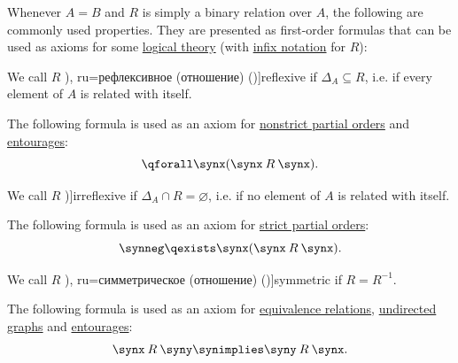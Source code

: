 \begin{comments}
\begin{definition}
  Whenever \( A = B \) and \( R \) is simply a binary relation over \( A \), the following are commonly used properties. They are presented as first-order formulas that can be used as axioms for some \hyperref[def:logical_theory]{logical theory} (with \hyperref[def:function_application_notation/infix]{infix notation} for \( R \)):
  \begin{thmenum}[resume=def:binary_relation]
     We call \( R \) \term[bg=рефлексивна (релация) (\cite[369]{ГеновМиховскиМоллов1991Алгебра}), ru=рефлексивное (отношение) (\cite[def. 2.7]{Гуров2013ТеорияРешёток})]{reflexive} if \( \Delta_A \subseteq R \), i.e. if every element of \( A \) is related with itself.

    The following formula is used as an axiom for \hyperref[def:partially_ordered_set/strict]{nonstrict partial orders} and \hyperref[def:entourage]{entourages}:
    \begin{equation}\label{eq:def:binary_relation/reflexive}
      \qforall \synx (\synx \mathbin{R} \synx).
    \end{equation}

     We call \( R \) \term[ru=антирефлексивное (отношение) (\cite[def. 2.7]{Гуров2013ТеорияРешёток})]{irreflexive} if \( \Delta_A \cap R = \varnothing \), i.e. if no element of \( A \) is related with itself.

    The following formula is used as an axiom for \hyperref[def:partially_ordered_set/strict]{strict partial orders}:
    \begin{equation}\label{eq:def:binary_relation/irreflexive}
      \synneg \qexists \synx (\synx \mathbin{R} \synx).
    \end{equation}

     We call \( R \) \term[bg=симетрична (релация) (\cite[369]{ГеновМиховскиМоллов1991Алгебра}), ru=симметрическое (отношение) (\cite[def. 2.7]{Гуров2013ТеорияРешёток})]{symmetric} if \( R = R^{-1} \).

    The following formula is used as an axiom for \hyperref[def:equivalence_relation]{equivalence relations}, \hyperref[def:hypergraph/multigraph]{undirected graphs} and \hyperref[def:entourage]{entourages}:
    \begin{equation}\label{eq:def:binary_relation/symmetric}
      \synx \mathbin{R} \syny \synimplies \syny \mathbin{R} \synx.
    \end{equation}


\end{thmenum}
\end{definition}
\end{comments}
